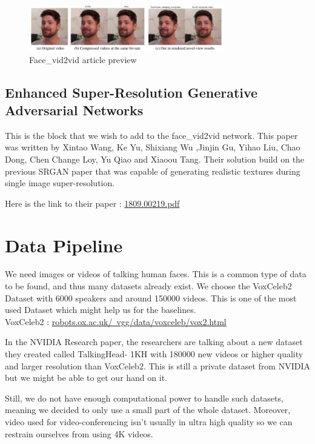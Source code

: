 \documentclass[twocolumn,10pt]{asme2ej}
\begin{document}
\begin{figure} 
\centerline{\includegraphics[width=3.34in]{figure/face_vid2vid.png}}
\caption{Face\_vid2vid article preview}
\label{fig_face_vid2vid.png}
\end{figure}


\subsection{Enhanced Super-Resolution Generative Adversarial Networks}

This is the block that we wish to add to the face\_vid2vid network. This paper was written by Xintao Wang, Ke Yu, Shixiang Wu
,Jinjin Gu, Yihao Liu, Chao Dong, Chen Change Loy, Yu Qiao and Xiaoou Tang. Their solution build on the previous SRGAN paper that was capable of generating realistic textures during single image super-resolution.

Here is the link to their paper : \href{https://arxiv.org/pdf/1809.00219.pdf}{1809.00219.pdf}

\section{Data Pipeline}

We need images or videos of talking human faces. This is a common type of data to be found, and thus many datasets already exist.
We choose the VoxCeleb2 Dataset with 6000 speakers and around 150000 videos. This is one of the most used Dataset which might help us for the baselines.\\
VoxCeleb2 : \href{https://www.robots.ox.ac.uk/~vgg/data/voxceleb/vox2.html}{robots.ox.ac.uk/~vgg/data/voxceleb/vox2.html}


In the NVIDIA Research paper, the researchers are talking about a new dataset they created called TalkingHead-
1KH with 180000 new videos or higher quality and larger resolution than VoxCeleb2. This is still a private dataset from NVIDIA but we might be able to get our hand on it.

Still, we do not have enough computational power to handle such datasets, meaning we decided to only use a small part of the whole dataset. Moreover, video used for video-conferencing isn't usually in ultra high quality so we can restrain ourselves from using 4K videos.
\end{document}
